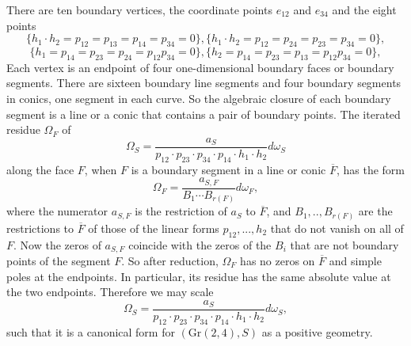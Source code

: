 \documentclass[12pt]{extarticle}
\theoremstyle{definition}
\newenvironment{example}
{\pushQED{\qed}\renewcommand{\qedsymbol}{$\diamond$}\examplex}
{\popQED\endexamplex}
\begin{document}
\begin{example}
There are ten boundary vertices, the coordinate points $e_{12}$ and $e_{34}$ and the eight points 
$$\{h_1\cdot h_2=p_{12}=p_{13}=p_{14}=p_{34}=0\},\{h_1\cdot h_2=p_{12}=p_{24}=p_{23}=p_{34}=0\},$$
$$\{h_1=p_{14}=p_{23}=p_{24}=p_{12}p_{34}=0\},\{ h_2=p_{14}=p_{23}=p_{13}=p_{12}p_{34}=0\},$$
Each vertex is an endpoint of four one-dimensional boundary faces or boundary segments.  There are sixteen boundary line segments and four boundary segments in conics, one segment in each curve. So the algebraic closure of each boundary segment is a line or a conic that contains a pair of boundary points.
The iterated residue $\Omega_F$ of  $$\Omega_S=\frac{a_S}{p_{12}\cdot p_{23}\cdot p_{34}\cdot p_{14}\cdot h_1\cdot h_2}d\omega_S$$
along the face $F$, when $F$ is a boundary segment in a line or conic $\overline F$, has the form $$\Omega_F=\frac{a_{S,F}}{ B_1\cdots B_{r(F)}}d\omega_F,$$ where the numerator $a_{S,F}$ is the restriction of $a_S$ to $\overline F$, and $B_1,..,B_{r(F)}$ are the restrictions to $\overline F$ of those of the linear forms $p_{12},...,h_2$ that do not vanish on all of $F$.  Now the zeros of $a_{S,F}$ coincide with the zeros of the $B_i$ that are not boundary points of the segment $F$. So after reduction,   $\Omega_F$ has no zeros on $\overline F$ and  simple poles at the endpoints.  In particular, its residue has the same absolute value at the two endpoints.
Therefore we may scale $$\Omega_S=\frac{a_S}{p_{12}\cdot p_{23}\cdot p_{34}\cdot p_{14}\cdot h_1\cdot h_2}d\omega_S,$$
such that it is a canonical form for $(\mathrm{Gr}(2,4), S)$  as a positive geometry. 
\end{example}
\end{document}
